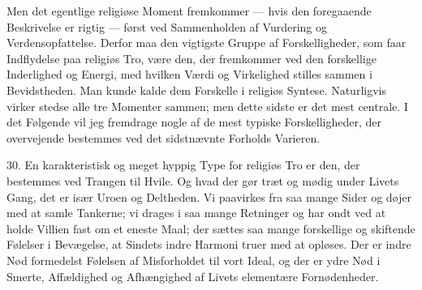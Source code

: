 \documentclass[12pt,a4paper,openany]{book}
\newcommand{\opage}[1]{\marginnote{\footnotesize\textit{[#1]}}}
\begin{document}
Men det egentlige religiøse Moment fremkommer --- hvis den foregaaende
Beskrivelse er rigtig --- først ved Sammenholden af Vurdering og
Verdensopfattelse. Derfor maa den vigtigste Gruppe af Forskelligheder,
som faar Indflydelse paa religiøs Tro, være den, der fremkommer ved den
forskellige Inderlighed og Energi, med hvilken Værdi og Virkelighed
stilles sammen i Bevidstheden. Man kunde kalde dem Forskelle i religiøs
Syntese. Naturligvis virker stedse alle tre Momenter sammen; men dette
sidste er det mest centrale. I det Følgende vil jeg fremdrage nogle af
de mest typiske Forskelligheder, der overvejende bestemmes ved det
sidstnævnte Forholds Varieren.

30. En karakteristisk og meget hyppig Type for religiøs Tro er den, der
bestemmes ved Trangen til Hvile. Og hvad der gør træt og mødig under
Livets Gang, det er især Uroen og Deltheden. Vi paavirkes fra saa mange
Sider og døjer med at samle Tankerne; vi drages i saa mange Retninger og
har ondt ved at holde
\opage{73}Villien fast om et eneste Maal; der sættes saa mange
forskellige og skiftende Følelser i Bevægelse, at Sindets indre Harmoni
truer med at opløses. Der er indre Nød formedelst Følelsen af
Misforholdet til vort Ideal, og der er ydre Nød i Smerte, Affældighed og
Afhængighed af Livets elementære Fornødenheder.
\end{document}
